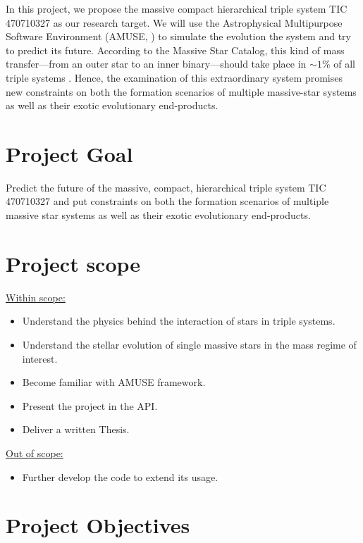 \documentclass{uva-inf-article}
\numberwithin{equation}{section}
\begin{document}
In this project, we propose the massive compact hierarchical triple system TIC 470710327 as our research target. We will use the Astrophysical Multipurpose Software Environment (AMUSE, \cite{portegies2018astrophysical}) to simulate the evolution the system and try to predict its future. According to the Massive Star Catalog, this kind of mass transfer—from an outer star to an inner binary—should take place in $ \sim 1\%$ of all triple systems \citep{de2014evolution,hamers2022statistical}. Hence, the examination of this extraordinary system promises new constraints on both the formation scenarios of multiple massive-star systems as well as their exotic evolutionary end-products.
\\

\section{Project Goal}

Predict the future of the massive, compact, hierarchical triple system TIC 470710327 and put constraints on both the formation scenarios of multiple massive star systems as well as their exotic evolutionary end-products.

\section{Project scope}
\underline{Within scope:}
\begin{itemize}
    \item Understand the physics behind the interaction of stars in triple systems.
    \item Understand the stellar evolution of single massive stars in the mass regime of interest.
    \item Become familiar with AMUSE framework.
    \item Present the project in the API.
    \item Deliver a written Thesis.
\end{itemize}

\hspace*{-0.7cm}\underline{Out of scope:}
\begin{itemize}
    \item Further develop the code to extend its usage.
\end{itemize}

\section{Project Objectives}
\end{document}
